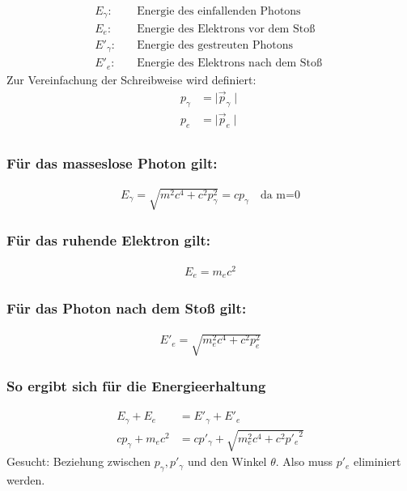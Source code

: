 \begin{align*}
	E_\gamma :&\quad \text{Energie des einfallenden Photons} \\
	E_e       : &\quad \text{Energie des Elektrons vor dem Stoß } \\
	E'_\gamma  :&\quad \text{Energie des gestreuten Photons} \\
	E'_e       :&\quad \text{Energie des Elektrons nach dem Stoß }
\end{align*}
Zur Vereinfachung der Schreibweise wird definiert:\\
\begin{align*}
	p_\gamma &=	\mid   \overrightarrow{p}_\gamma\mid\\
	p_e &=	\mid   \overrightarrow{p}_e\mid\\
\end{align*}



\subsubsection*{Für das masseslose Photon gilt: }
\begin{align*}
	E_\gamma =\sqrt{m^2c^4+c^2p_\gamma^2}=cp_\gamma\quad \text{da m=0}
\end{align*}

\subsubsection*{Für das ruhende Elektron gilt: }
\begin{align*}
	E_e =m_ec^2
\end{align*}
\subsubsection*{Für das Photon nach dem Stoß  gilt: }
\begin{align*}
	E'_e =\sqrt{m_e^2c^4+c^2p_e^2}
\end{align*}
\subsubsection*{So ergibt sich für die Energieerhaltung}
\begin{align}
	E_\gamma + E_e&= E'_\gamma + E'_e\nonumber\\
	cp_\gamma+m_ec^2&=cp'_\gamma+\sqrt{m_e^2c^4+c^2{p'_e}^2} \label{Energie}
\end{align}
Gesucht: Beziehung zwischen $p_\gamma, p'_\gamma$ und den Winkel $\theta$. Also muss $p'_e$ eliminiert werden.\\
